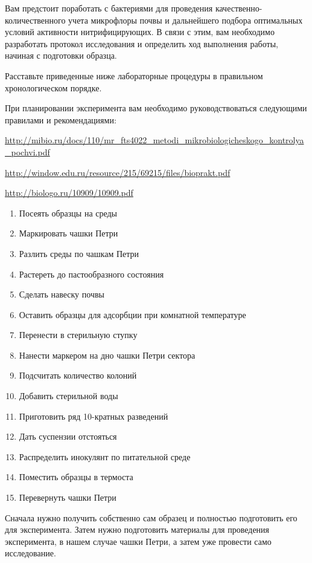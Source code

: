 
Вам предстоит поработать с бактериями для проведения качественно- количественного учета микрофлоры 
почвы и дальнейшего подбора оптимальных условий  активности нитрифицирующих. В связи с этим,  
вам необходимо разработать протокол исследования и определить ход выполнения работы, начиная с 
подготовки образца.

Расставьте приведенные ниже лабораторные процедуры в правильном хронологическом порядке. 

При планировании эксперимента вам необходимо руководствоваться следующими правилами и рекомендациями:

\noindent\url{http://mibio.ru/docs/110/mr_fts4022_metodi_mikrobiologicheskogo_kontrolya_pochvi.pdf}

\noindent\url{http://window.edu.ru/resource/215/69215/files/bioprakt.pdf}

\noindent\url{http://biologo.ru/10909/10909.pdf}

\begin{enumerate}
    \item Посеять образцы на среды
    \item Маркировать чашки Петри
    \item Разлить среды по чашкам Петри
    \item Растереть до пастообразного состояния
    \item Сделать навеску почвы
    \item Оставить образцы для адсорбции при комнатной температуре
    \item Перенести в стерильную ступку
    \item Нанести маркером на дно чашки Петри сектора
    \item Подсчитать количество колоний
    \item Добавить стерильной воды
    \item Приготовить ряд 10-кратных разведений
    \item Дать суспензии отстояться
    \item Распределить инокулянт по питательной среде
    \item Поместить образцы в термоста
    \item Перевернуть чашки Петри
\end{enumerate}

\explanationSection

Сначала нужно получить собственно сам образец и полностью подготовить его для эксперимента. Затем нужно подготовить материалы для проведения эксперимента, в нашем случае чашки Петри, а затем уже провести само исследование.

